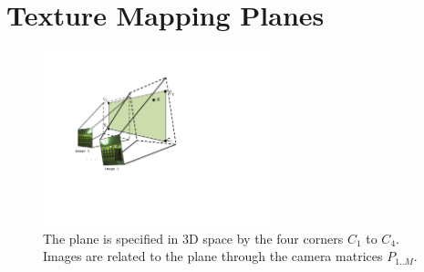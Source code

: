 \documentclass[runningheads]{llncs}
\begin{document}




\section{Texture Mapping Planes}
\label{sec:corridors}



\begin{figure}
\centering
\includegraphics[height=2in]{Projection.pdf}
\caption{The plane is specified in 3D space by the four corners $C_1$ to $C_4$. Images are related to the plane through the camera matrices $P_{1..M}$. }
\label{fig:projection}
\end{figure}
\end{document}
